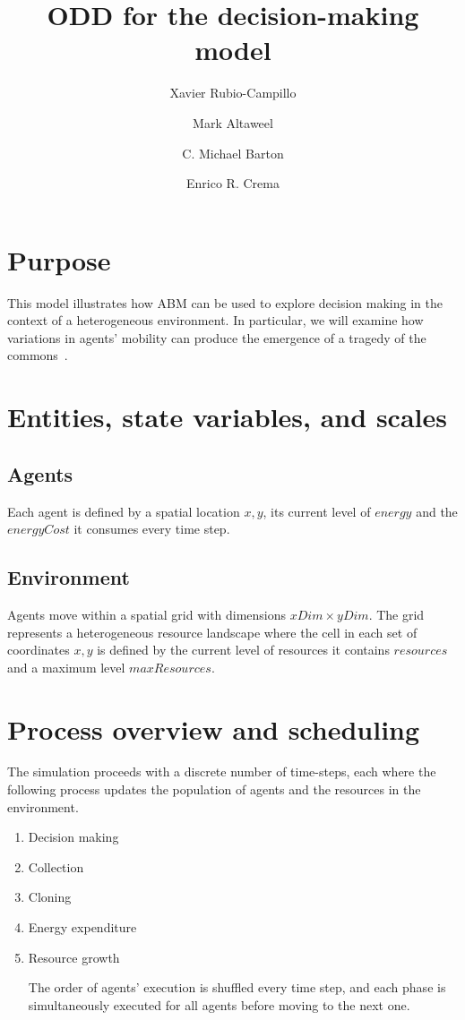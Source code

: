 \documentclass[11pt,a4paper,twocolumn,notitlepage]{article}
\begin{document}
\title{ODD for the decision-making model}
\author{Xavier Rubio-Campillo \and Mark Altaweel \and C. Michael Barton \and Enrico R. Crema}
\maketitle

\section{Purpose}

This model illustrates how ABM can be used to explore decision making in the context of a heterogeneous environment. In particular, we will examine how variations in agents' mobility can produce the emergence of a tragedy of the commons~\citep{hardin1968tragedy}.

\section{Entities, state variables, and scales}
\subsection{Agents}

Each agent is defined by a spatial location $x,y$, its current level of $energy$ and the $energyCost$ it consumes every time step.

\subsection{Environment}

Agents move within a spatial grid with dimensions $xDim \times yDim$. The grid represents a heterogeneous resource landscape where the cell in each set of coordinates $x,y$ is defined by the current level of resources it contains $resources$ and a maximum level $maxResources$. 

\section{Process overview and scheduling}

The simulation proceeds with a discrete number of time-steps, each where the following process updates the population of agents and the resources in the environment.

\begin{enumerate}
\item{Decision making}
\item{Collection}
\item{Cloning}
\item{Energy expenditure}
\item{Resource growth}

The order of agents' execution is shuffled every time step, and each phase is simultaneously executed for all agents before moving to the next one.

\end{enumerate}
\end{document}
